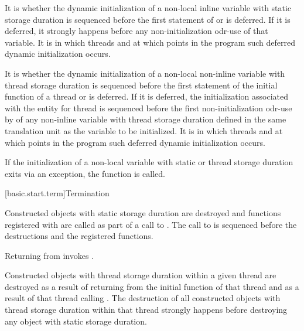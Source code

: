 \pnum
It is 
whether the dynamic initialization of a
non-local inline variable with static storage duration
is sequenced before the first statement of  or is deferred.
If it is deferred, it strongly happens before
any non-initialization odr-use
of that variable.
It is 
in which threads and at which points in the program such deferred dynamic initialization occurs.

\pnum
It is 
whether the dynamic initialization of a
non-local non-inline variable with thread storage duration
is sequenced before the first statement of the initial function of a thread or is deferred.
If it is deferred,
the initialization associated with the entity for thread 
is sequenced before the first non-initialization odr-use by 
of any non-inline variable with thread storage duration
defined in the same translation unit as the variable to be initialized.
It is 
in which threads and at which points in the program such deferred dynamic initialization occurs.

\pnum
If the initialization of
a non-local variable with static or thread storage duration
exits via an exception,
the function  is called.%

[basic.start.term]{Termination}

\pnum
{}%
%
%
Constructed objects
with static storage duration are destroyed
and functions registered with 
are called as part of a call to
%
%
.
The call to  is sequenced before
the destructions and the registered functions.
\begin{note}
Returning from  invokes .
\end{note}

\pnum
Constructed objects with thread storage duration within a given thread
are destroyed as a result of returning from the initial function of that thread and as a
result of that thread calling .
The destruction of all constructed objects with thread storage
duration within that thread strongly happens before destroying
any object with static storage duration.

